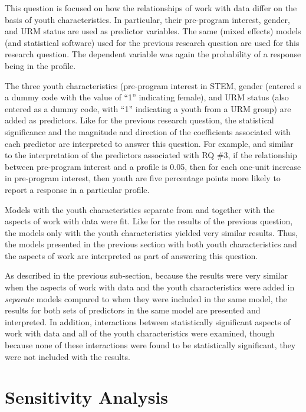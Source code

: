 \documentclass[]{book}
\theoremstyle{definition}
\theoremstyle{definition}
\theoremstyle{definition}
\theoremstyle{remark}
\begin{document}
This question is focused on how the relationships of work with data
differ on the basis of youth characteristics. In particular, their
pre-program interest, gender, and URM status are used as predictor
variables. The same (mixed effects) models (and statistical software)
used for the previous research question are used for this research
question. The dependent variable was again the probability of a response
being in the profile.

The three youth characteristics (pre-program interest in STEM, gender
(entered s a dummy code with the value of ``1'' indicating female), and
URM status (also entered as a dummy code, with ``1'' indicating a youth
from a URM group) are added as predictors. Like for the previous
research question, the statistical significance and the magnitude and
direction of the coefficients associated with each predictor are
interpreted to answer this question. For example, and similar to the
interpretation of the predictors associated with RQ \#3, if the
relationship between pre-program interest and a profile is 0.05, then
for each one-unit increase in pre-program interest, then youth are five
percentage points more likely to report a response in a particular
profile.

Models with the youth characteristics separate from and together with
the aspects of work with data were fit. Like for the results of the
previous question, the models only with the youth characteristics
yielded very similar results. Thus, the models presented in the previous
section with both youth characteristics and the aspects of work are
interpreted as part of answering this question.

As described in the previous sub-section, because the results were very
similar when the aspects of work with data and the youth characteristics
were added in \emph{separate} models compared to when they were included
in the same model, the results for both sets of predictors in the same
model are presented and interpreted. In addition, interactions between
statistically significant aspects of work with data and all of the youth
characteristics were examined, though because none of these interactions
were found to be statistically significant, they were not included with
the results.

\section{Sensitivity Analysis}\label{sensitivity-analysis}
\end{document}
